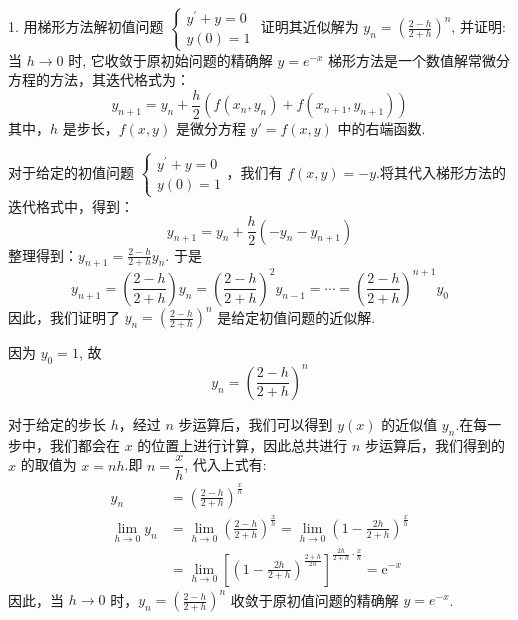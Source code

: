 \begin{tcolorbox}[breakable,
		colframe=white!10!jingga, coltitle=white!90!jingga, colback=white!95!jingga, coltext=black, colbacktitle=white!10!jingga, enhanced, fonttitle=\bfseries,fontupper=\normalsize, attach boxed title to top left={yshift=-2mm}, before skip=8pt, after skip=8pt,
		title=解答题]

1. 用梯形方法解初值问题 $ \left\{\begin{array}{c}y^{\prime}+y=0 \\ y(0)=1\end{array}\right. $ 证明其近似解为 $ y_{n}=\left(\frac{2-h}{2+h}\right)^{n} $, 并证明: 当 $ h \rightarrow 0 $ 时, 它收敛于原初始问题的精确解 $ y=e^{-x} $
\tcblower
梯形方法是一个数值解常微分方程的方法，其迭代格式为：
$$ y_{n+1} = y_n + \frac{h}{2}(f(x_n, y_n) + f(x_{n+1}, y_{n+1})) $$
其中，$ h $ 是步长，$ f(x, y) $ 是微分方程 $ y' = f(x, y) $ 中的右端函数.

对于给定的初值问题 $ \left\{\begin{array}{l}y^{\prime}+y=0 \\ y(0)=1\end{array}\right. $，我们有 $ f(x, y) = -y $.将其代入梯形方法的迭代格式中，得到：
$$ y_{n+1} = y_n + \frac{h}{2}(-y_n - y_{n+1}) $$
整理得到：$ y_{n+1} = \frac{2-h}{2+h}y_n $. 于是
$$
y_{n+1}=\left(\frac{2-h}{2+h}\right) y_{n}=\left(\frac{2-h}{2+h}\right)^{2} y_{n-1}=\cdots=\left(\frac{2-h}{2+h}\right)^{n+1} y_{0}
$$
因此，我们证明了 $ y_{n}=\left(\frac{2-h}{2+h}\right)^{n} $ 是给定初值问题的近似解.

因为 $ y_{0}=1 $, 故
$$
y_{n}=\left(\frac{2-h}{2+h}\right)^{n}
$$

对于给定的步长 $ h $，经过 $ n $ 步运算后，我们可以得到 $ y(x) $ 的近似值 $ y_n$.在每一步中，我们都会在 $ x $ 的位置上进行计算，因此总共进行 $ n $ 步运算后，我们得到的 $ x $ 的取值为 $ x = nh $.即 $ n=\dfrac{x}{h} $, 代入上式有:
$$
\begin{aligned}
y_{n}&=\left(\frac{2-h}{2+h}\right)^{\frac x  h} \\
\lim _{h \rightarrow 0} y_{n}&=\lim _{h \rightarrow 0}\left(\frac{2-h}{2+h}\right)^{\frac{x}{h}}=\lim _{h \rightarrow 0}\left(1-\frac{2 h}{2+h}\right)^{\frac{x}{h}} \\
&=\lim _{h \rightarrow 0}\left[\left(1-\frac{2 h}{2+h}\right)^{\frac{2+h}{2 h}}\right]^{\frac{2 h}{2+h}\cdot \frac{x}{h}}=\mathrm{e}^{-x}
\end{aligned}
$$
因此，当 $ h \rightarrow 0 $ 时，$ y_{n}=\left(\frac{2-h}{2+h}\right)^{n} $ 收敛于原初值问题的精确解 $ y=e^{-x} $.
\end{tcolorbox}



